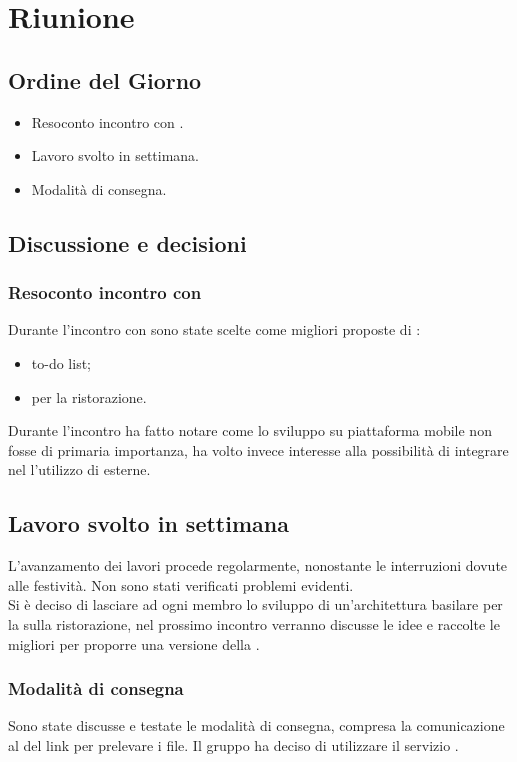 
\section{Riunione}
\subsection{Ordine del Giorno}
\begin{itemize}
	\item Resoconto incontro con \Proponente{}.
	\item Lavoro svolto in settimana.
	\item Modalità di consegna.
\end{itemize}

\subsection{Discussione e decisioni}
\subsubsection{Resoconto incontro con \Proponente{}}
Durante l'incontro con \Proponente{} sono state scelte come migliori proposte di :
\begin{itemize}
	\item to-do list;
	\item {} per la ristorazione.
\end{itemize}
Durante l'incontro \Proponente{} ha fatto notare come lo sviluppo su piattaforma mobile non fosse di primaria importanza, ha volto invece interesse alla possibilità di integrare nel  l'utilizzo di  esterne.

\subsection{Lavoro svolto in settimana}
L'avanzamento dei lavori procede regolarmente, nonostante le interruzioni dovute alle festività. Non sono stati verificati problemi evidenti.\\
Si è deciso di lasciare ad ogni membro lo sviluppo di un'architettura basilare per la  sulla ristorazione, nel prossimo incontro verranno discusse le idee e raccolte le migliori per proporre una versione della .

\subsubsection{Modalità di consegna}
Sono state discusse e testate le modalità di consegna, compresa la comunicazione al \Committente{} del link per prelevare i file. Il gruppo ha deciso di utilizzare il servizio . 

\clearpage
